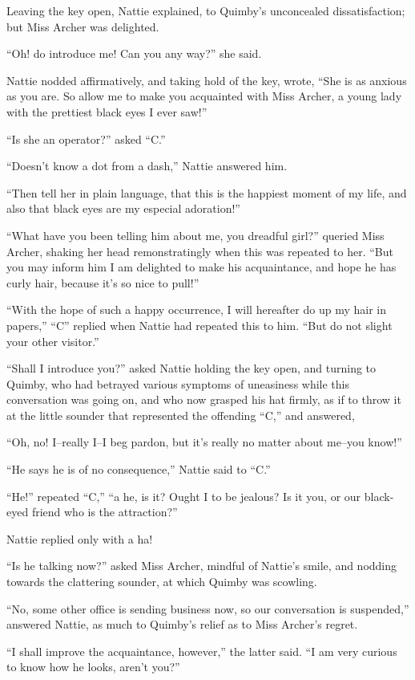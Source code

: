 Leaving the key open, Nattie explained, to Quimby's unconcealed
dissatisfaction; but Miss Archer was delighted.

``Oh! do introduce me! Can you any way?'' she said.

Nattie nodded affirmatively, and taking hold of the key, wrote, ``She is
as anxious as you are. So allow me to make you acquainted with Miss
Archer, a young lady with the prettiest black eyes I ever saw!''

``Is she an operator?'' asked ``C.''

``Doesn't know a dot from a dash,'' Nattie answered him.

``Then tell her in plain language, that this is the happiest moment of my
life, and also that black eyes are my especial adoration!''

``What have you been telling him about me, you dreadful girl?'' queried
Miss Archer, shaking her head remonstratingly when this was repeated to
her. ``But you may inform him I am delighted to make his acquaintance,
and hope he has curly hair, because it's so nice to pull!''

``With the hope of such a happy occurrence, I will hereafter do up my
hair in papers,'' ``C'' replied when Nattie had repeated this to him. ``But
do not slight your other visitor.''

``Shall I introduce you?'' asked Nattie holding the key open, and turning
to Quimby, who had betrayed various symptoms of uneasiness while this
conversation was going on, and who now grasped his hat firmly, as if to
throw it at the little sounder that represented the offending ``C,'' and
answered,

``Oh, no! I--really I--I beg pardon, but it's really no matter about
me--you know!''

``He says he is of no consequence,'' Nattie said to ``C.''

``He!'' repeated ``C,'' ``a he, is it? Ought I to be jealous? Is it you, or
our black-eyed friend who is the attraction?''

Nattie replied only with a ha!

``Is he talking now?'' asked Miss Archer, mindful of Nattie's smile, and
nodding towards the clattering sounder, at which Quimby was scowling.

``No, some other office is sending business now, so our conversation is
suspended,'' answered Nattie, as much to Quimby's relief as to Miss
Archer's regret.

``I shall improve the acquaintance, however,'' the latter said. ``I am very
curious to know how he looks, aren't you?''

